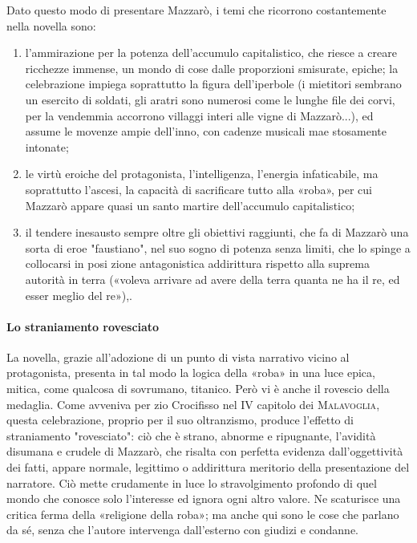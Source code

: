 \documentclass{book}
\newcounter{mar}
\begin{document}
Dato questo modo di presentare Mazzarò, i temi che ricorrono costantemente nella novella sono:
\begin{enumerate}
\item l'ammirazione per la potenza dell'accumulo capitalistico, che riesce a creare ricchezze immense, un mondo di cose dalle proporzioni smisurate, epiche; la celebrazione impiega soprattutto la figura dell'iperbole (i mietitori sembrano un esercito di soldati, gli aratri sono numerosi come le lunghe file dei corvi, per la vendemmia accorrono villaggi interi alle vigne di Mazzarò...), ed assume le movenze ampie dell'inno, con cadenze musicali mae stosamente intonate;
\item le virtù eroiche del protagonista, l'intelligenza, l'energia infaticabile, ma soprattutto l'ascesi, la capacità di sacrificare tutto alla «roba», per cui Mazzarò appare quasi un santo martire dell'accumulo capitalistico;
\item il tendere inesausto sempre oltre gli obiettivi raggiunti, che fa di Mazzarò una sorta di eroe "faustiano", nel suo sogno di potenza senza limiti, che lo spinge a collocarsi in posi zione antagonistica addirittura rispetto alla suprema autorità in terra («voleva arrivare ad avere della terra quanta ne ha il re, ed esser meglio del re»),.
\end{enumerate}

\paragraph{Lo straniamento rovesciato}

La novella, grazie all'adozione di un punto di vista narrativo vicino al protagonista, presenta in tal modo la logica della «roba» in una luce epica, mitica, come qualcosa di sovrumano, titanico. Però vi è anche il rovescio della medaglia. Come avveniva per zio Crocifisso nel IV capitolo dei \textsc{Malavoglia}, questa celebrazione, proprio per il suo oltranzismo, produce l'effetto di straniamento "rovesciato": ciò che è strano, abnorme e ripugnante, l'avidità disumana e crudele di Mazzarò, che risalta con perfetta evidenza dall'oggettività dei fatti, appare normale, legittimo o addirittura meritorio della presentazione del narratore. Ciò mette crudamente in luce lo stravolgimento profondo di quel mondo che conosce solo l'interesse ed ignora ogni altro valore. Ne scaturisce una critica ferma della «religione della roba»; ma anche qui sono le cose che parlano da sé, senza che l'autore intervenga dall'esterno con giudizi e condanne.
\end{document}
